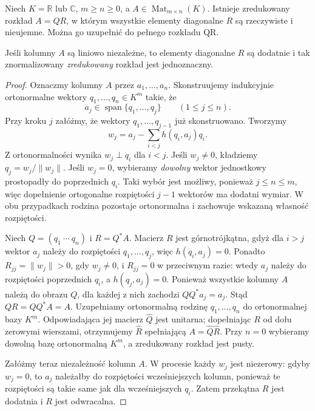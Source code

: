 \begin{twierdzenie}
\label{thm:lin15-qr}
Niech \(K=\mathbb R\) lub \(\mathbb C\),
\(m\ge n\ge0\), a
\(A\in\operatorname{Mat}_{m\times n}(K)\).
Istnieje zredukowany rozkład
\(A=QR\), w którym wszystkie
elementy diagonalne \(R\)
są rzeczywiste i nieujemne.
Można go uzupełnić do pełnego
rozkładu QR.

Jeśli kolumny \(A\) są liniowo
niezależne, to elementy
diagonalne \(R\) są dodatnie
i tak znormalizowany
\emph{zredukowany} rozkład
jest jednoznaczny.
\end{twierdzenie}
\begin{proof}
Oznaczmy kolumny \(A\)
przez \(a_1,\ldots,a_n\).
Skonstruujemy indukcyjnie
ortonormalne wektory
\(q_1,\ldots,q_n\in K^m\)
takie, że
\[
 a_j\in\operatorname{span}
       \{q_1,\ldots,q_j\}
 \qquad(1\le j\le n).
\]
Przy kroku \(j\) załóżmy,
że wektory \(q_1,\ldots,q_{j-1}\)
już skonstruowano.
Tworzymy
\[
 w_j=a_j-\sum_{i<j}h(q_i,a_j)q_i.
\]
Z ortonormalności wynika
\(w_j\perp q_i\) dla \(i<j\).
Jeśli \(w_j\ne0\), kładziemy
\(q_j=w_j/\|w_j\|\).
Jeśli \(w_j=0\), wybieramy
\emph{dowolny} wektor jednostkowy
prostopadły do poprzednich \(q_i\).
Taki wybór jest możliwy,
ponieważ \(j\le n\le m\),
więc dopełnienie ortogonalne
rozpiętości \(j-1\) wektorów
ma dodatni wymiar.
W obu przypadkach
rodzina pozostaje ortonormalna
i zachowuje wskazaną własność
rozpiętości.

Niech \(Q=(q_1\ \cdots\ q_n)\)
i \(R=Q^*A\).
Macierz \(R\) jest górnotrójkątna,
gdyż dla \(i>j\)
wektor \(a_j\) należy do
rozpiętości \(q_1,\ldots,q_j\),
więc \(h(q_i,a_j)=0\).
Ponadto \(R_{jj}=\|w_j\|>0\),
gdy \(w_j\ne0\), i \(R_{jj}=0\)
w przeciwnym razie:
wtedy \(a_j\) należy
do rozpiętości poprzednich \(q_i\),
a \(h(q_j,a_j)=0\).
Ponieważ wszystkie kolumny \(A\)
należą do obrazu \(Q\),
dla każdej z nich zachodzi
\(QQ^*a_j=a_j\).
Stąd
\(QR=QQ^*A=A\).
Uzupełniamy ortonormalną rodzinę
\(q_1,\ldots,q_n\)
do ortonormalnej bazy \(K^m\).
Odpowiadająca jej
macierz \(\widehat Q\)
jest unitarna; dopełniając
\(R\) od dołu zerowymi wierszami,
otrzymujemy \(\widehat R\)
spełniającą \(A=\widehat Q\widehat R\).
Przy \(n=0\) wybieramy
dowolną bazę ortonormalną
\(K^m\), a zredukowany
rozkład jest pusty.

Załóżmy teraz niezależność
kolumn \(A\). W procesie
każdy \(w_j\) jest niezerowy:
gdyby \(w_j=0\), to \(a_j\)
należałby do rozpiętości
wcześniejszych kolumn, ponieważ
te rozpiętości są takie same
jak dla wcześniejszych \(q_i\).
Zatem przekątna \(R\)
jest dodatnia i \(R\)
jest odwracalna.


\end{proof}
